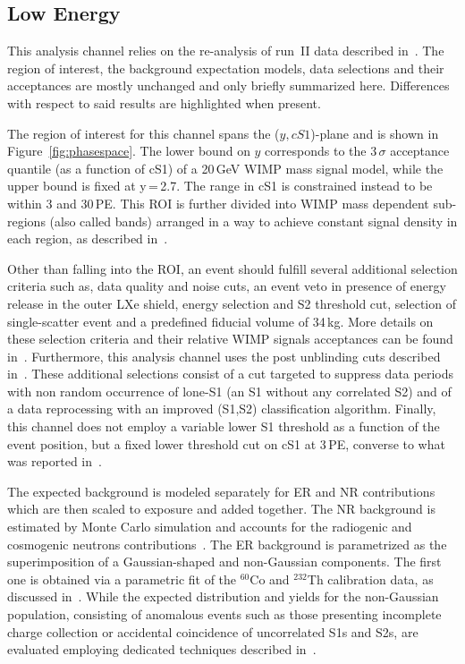 
\subsection{Low Energy}
\label{subsec:LowE}
This analysis channel relies on the re-analysis of run~II data described in~\cite{xe100_run_combination}. The region of interest, the background 
expectation models, data selections and their acceptances are mostly unchanged and only briefly summarized here. Differences with respect to said results are highlighted when present.

The region of interest for this channel spans the ($y,cS1$)-plane and is shown in Figure~\ref{fig:phasespace}.  The lower 
bound on $y$ corresponds to the 3\,$\sigma$ acceptance quantile (as a function of cS1) of a 20\,GeV WIMP mass signal model, while the upper bound is fixed at y\,=\,2.7.
The range in cS1 is constrained instead to be within 3 and 30\,PE. This  ROI is further divided into WIMP mass dependent sub-regions (also called bands) arranged in a way 
to achieve constant signal density in each region, as described in~\cite{xe100_run_combination}.

Other than falling into the ROI, an event should fulfill several additional selection criteria such as, data quality and noise cuts,
an event veto in presence of energy release in the outer LXe shield, energy selection and S2 threshold cut,
selection of single-scatter event and a predefined fiducial volume of 34\,kg. More details on these selection criteria and their 
relative WIMP signals acceptances can be found in~\cite{Aprile:2012vw,xe100_run_combination}. 
Furthermore, this analysis channel uses the post unblinding cuts described in~\cite{xe100_run_combination}. 
These additional selections consist of a cut targeted to suppress data periods with non random occurrence of lone-S1 (an S1 without 
any correlated S2) and of a data reprocessing with an improved (S1,S2) classification algorithm.
Finally, this channel does not employ a variable lower S1 threshold as a function of the event position, but a fixed 
lower threshold cut on cS1 at 3\,PE, converse to what was reported in~\cite{xe100_run_combination}.

The expected background is modeled separately for ER and NR contributions which are then scaled to exposure and added together.
The NR background is estimated by Monte Carlo simulation and accounts for the radiogenic and cosmogenic neutrons
contributions~\cite{Aprile:2013tov}.
The ER background is parametrized as the superimposition of a Gaussian-shaped and non-Gaussian components.
The first one is obtained via a parametric fit of the $^{60}$Co and $^{232}$Th calibration data, as discussed in~\cite{xe100_run10_si}.
While the expected distribution and yields for the non-Gaussian population, consisting of anomalous events such as those 
presenting incomplete charge collection or accidental coincidence of uncorrelated S1s and S2s,  
are evaluated employing dedicated techniques described in~\cite{xe100_run_combination}.

